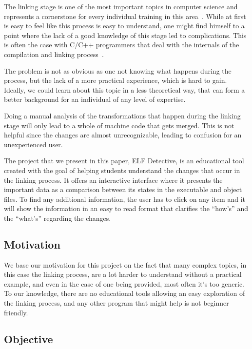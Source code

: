 The linking stage is one of the most important topics in computer science and represents a cornerstone for every individual training in this area~\cite{lal}. While at first is easy to feel like this process is easy to understand, one might find himself to a point where the lack of a good knowledge of this stage led to complications. This is often the case with C/C++ programmers that deal with the internals of the compilation and linking process~\cite{milan}.

The problem is not as obvious as one not knowing what happens during the process, but the lack of a more practical experience, which is hard to gain. Ideally, we could learn about this topic in a less theoretical way, that can form a better background for an individual of any level of expertise.

Doing a manual analysis of the transformations that happen during the linking stage will only lead to a whole of machine code that gets merged. This is not helpful since the changes are almost unrecognizable, leading to confusion for an unexperienced user.

The project that we present in this paper, ELF Detective, is an educational tool created with the goal of helping students understand the changes that occur in the linking process. It offers an interactive interface where it presents the important data as a comparison between its states in the executable and object files. To find any additional information, the user has to click on any item and it will show the information in an easy to read format that clarifies the ``how's'' and the ``what's'' regarding the changes.

\subsection{Motivation}
\label{sec:motivation}

We base our  motivation for this project on the fact that many complex topics, in this case the linking process, are a lot harder to understand without a practical example, and even in the case of one being provided, most often it's too generic. To our knowledge, there are no educational tools allowing an easy exploration of the linking process, and any other program that might help is not beginner friendly.

\subsection{Objective}
\label{sec:obj}

